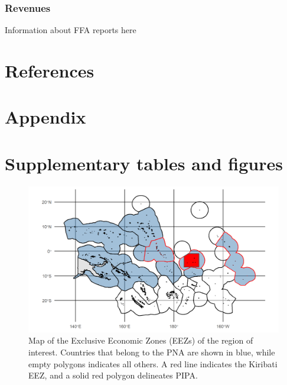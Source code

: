 \documentclass[9p,twocolumn,twoside,lineno]{pnas-new}
\begin{document}
\subsubsection{Revenues}

Information about FFA reports here

\section{References}




\clearpage

\onecolumn

\FloatBarrier

\section{Appendix}\label{appendix}



\newcommand{\beginsupplement}{\setcounter{table}{0}  \renewcommand{\thetable}{S\arabic{table}} \setcounter{figure}{0} \renewcommand{\thefigure}{S\arabic{figure}}}

\setcounter{table}{0}  \renewcommand{\thetable}{S\arabic{table}} \setcounter{figure}{0} \renewcommand{\thefigure}{S\arabic{figure}}

\section{Supplementary tables and figures}



\clearpage



\clearpage

\begin{figure}
\centering
\includegraphics{img/PNA_map.png}
\caption{\label{fig:PNA_map}Map of the Exclusive Economic Zones (EEZs) of the region of interest. Countries that belong to the PNA are shown in blue, while empty polygons indicates all others. A red line indicates the Kiribati EEZ, and a solid red polygon delineates PIPA.}
\end{figure}
\end{document}

